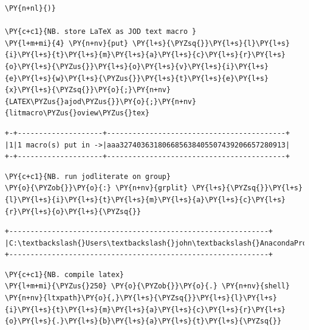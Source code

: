 \begin{tcolorbox}[breakable, size=fbox, boxrule=1pt, pad at break*=1mm,colback=cellbackground, colframe=cellborder]
\begin{Verbatim}[commandchars=\\\{\}]
\PY{n+nl}{)}

\PY{c+c1}{NB. store LaTeX as JOD text macro }
\PY{l+m+mi}{4} \PY{n+nv}{put} \PY{l+s}{\PYZsq{}}\PY{l+s}{l}\PY{l+s}{i}\PY{l+s}{t}\PY{l+s}{m}\PY{l+s}{a}\PY{l+s}{c}\PY{l+s}{r}\PY{l+s}{o}\PY{l+s}{\PYZus{}}\PY{l+s}{o}\PY{l+s}{v}\PY{l+s}{i}\PY{l+s}{e}\PY{l+s}{w}\PY{l+s}{\PYZus{}}\PY{l+s}{t}\PY{l+s}{e}\PY{l+s}{x}\PY{l+s}{\PYZsq{}}\PY{o}{;}\PY{n+nv}{LATEX\PYZus{}ajod\PYZus{}}\PY{o}{;}\PY{n+nv}{litmacro\PYZus{}oview\PYZus{}tex}
\end{Verbatim}
\end{tcolorbox}

    \begin{Verbatim}[commandchars=\\\{\}]
+-+--------------------+------------------------------------------+
|1|1 macro(s) put in ->|aaa327403631806685638405507439206657280913|
+-+--------------------+------------------------------------------+
    \end{Verbatim}

    \begin{tcolorbox}[breakable, size=fbox, boxrule=1pt, pad at break*=1mm,colback=cellbackground, colframe=cellborder]
\begin{Verbatim}[commandchars=\\\{\}]
\PY{c+c1}{NB. run jodliterate on group}
\PY{o}{\PYZob{}}\PY{o}{:} \PY{n+nv}{grplit} \PY{l+s}{\PYZsq{}}\PY{l+s}{l}\PY{l+s}{i}\PY{l+s}{t}\PY{l+s}{m}\PY{l+s}{a}\PY{l+s}{c}\PY{l+s}{r}\PY{l+s}{o}\PY{l+s}{\PYZsq{}}
\end{Verbatim}
\end{tcolorbox}

    \begin{Verbatim}[commandchars=\\\{\}]
+-------------------------------------------------------------+
|C:\textbackslash{}Users\textbackslash{}john\textbackslash{}AnacondaProjects\textbackslash{}testfolder\textbackslash{}grplit\textbackslash{}litmacro.bat|
+-------------------------------------------------------------+
    \end{Verbatim}

    \begin{tcolorbox}[breakable, size=fbox, boxrule=1pt, pad at break*=1mm,colback=cellbackground, colframe=cellborder]
\begin{Verbatim}[commandchars=\\\{\}]
\PY{c+c1}{NB. compile latex}
\PY{l+m+mi}{\PYZus{}250} \PY{o}{\PYZob{}}\PY{o}{.} \PY{n+nv}{shell} \PY{n+nv}{ltxpath}\PY{o}{,}\PY{l+s}{\PYZsq{}}\PY{l+s}{l}\PY{l+s}{i}\PY{l+s}{t}\PY{l+s}{m}\PY{l+s}{a}\PY{l+s}{c}\PY{l+s}{r}\PY{l+s}{o}\PY{l+s}{.}\PY{l+s}{b}\PY{l+s}{a}\PY{l+s}{t}\PY{l+s}{\PYZsq{}}
\end{Verbatim}
\end{tcolorbox}

